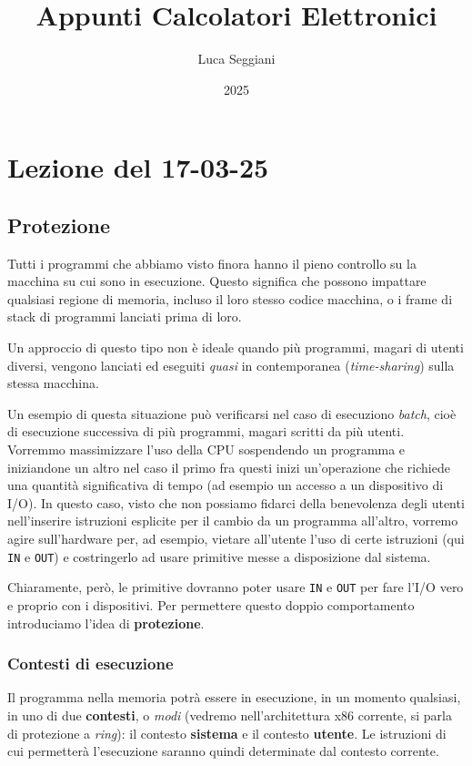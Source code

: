 \documentclass[a4paper,11pt]{article}
\title{Appunti Calcolatori Elettronici}
\author{Luca Seggiani}
\date{2025}
\begin{document}
\section{Lezione del 17-03-25}

\thispagestyle{empty}
\pagestyle{fancy}

\subsection{Protezione}
Tutti i programmi che abbiamo visto finora hanno il pieno controllo su la macchina su cui sono in esecuzione.
Questo significa che possono impattare qualsiasi regione di memoria, incluso il loro stesso codice macchina, o i frame di stack di programmi lanciati prima di loro.

Un approccio di questo tipo non è ideale quando più programmi, magari di utenti diversi, vengono lanciati ed eseguiti \textit{quasi} in contemporanea (\textit{time-sharing}) sulla stessa macchina.

Un esempio di questa situazione può verificarsi nel caso di esecuziono \textit{batch}, cioè di esecuzione successiva di più programmi, magari scritti da più utenti.
Vorremmo massimizzare l'uso della CPU sospendendo un programma e iniziandone un altro nel caso il primo fra questi inizi un'operazione che richiede una quantità significativa di tempo (ad esempio un accesso a un dispositivo di I/O).
In questo caso, visto che non possiamo fidarci della benevolenza degli utenti nell'inserire istruzioni esplicite per il cambio da un programma all'altro, vorremo agire sull'hardware per, ad esempio, vietare all'utente l'uso di certe istruzioni (qui \lstinline|IN| e \lstinline|OUT|) e costringerlo ad usare primitive messe a disposizione dal sistema.

Chiaramente, però, le primitive dovranno poter usare \lstinline|IN| e \lstinline|OUT| per fare l'I/O vero e proprio con i dispositivi.
Per permettere questo doppio comportamento introduciamo l'idea di \textbf{protezione}.

\subsubsection{Contesti di esecuzione}
Il programma nella memoria potrà essere in esecuzione, in un momento qualsiasi, in uno di due \textbf{contesti}, o \textit{modi} (vedremo nell'architettura x86 corrente, si parla di protezione a \textit{ring}): il contesto \textbf{sistema} e il contesto \textbf{utente}.
Le istruzioni di cui permetterà l'esecuzione saranno quindi determinate dal contesto corrente.
\end{document}
